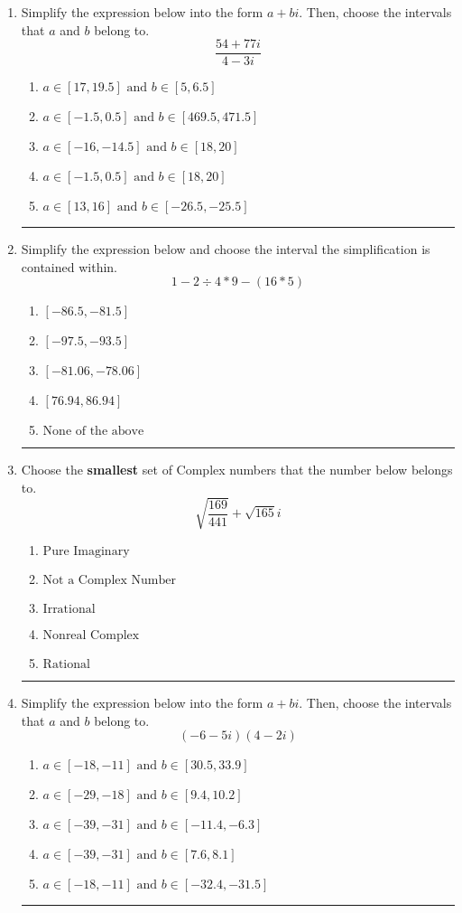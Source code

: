 \documentclass[14pt]{extbook}
\newcommand{\litem}[1]{\item#1\hspace*{-1cm}\rule{\textwidth}{0.4pt}}
\begin{document}
\begin{enumerate}
{\begin{enumerate}[label=\Alph*.]
\end{enumerate} }
\litem{
Simplify the expression below into the form $a+bi$. Then, choose the intervals that $a$ and $b$ belong to.\[ \frac{54 + 77 i}{4 - 3 i} \]\begin{enumerate}[label=\Alph*.]
\item \( a \in [17, 19.5] \text{ and } b \in [5, 6.5] \)
\item \( a \in [-1.5, 0.5] \text{ and } b \in [469.5, 471.5] \)
\item \( a \in [-16, -14.5] \text{ and } b \in [18, 20] \)
\item \( a \in [-1.5, 0.5] \text{ and } b \in [18, 20] \)
\item \( a \in [13, 16] \text{ and } b \in [-26.5, -25.5] \)

\end{enumerate} }
\litem{
Simplify the expression below and choose the interval the simplification is contained within.\[ 1 - 2 \div 4 * 9 - (16 * 5) \]\begin{enumerate}[label=\Alph*.]
\item \( [-86.5, -81.5] \)
\item \( [-97.5, -93.5] \)
\item \( [-81.06, -78.06] \)
\item \( [76.94, 86.94] \)
\item \( \text{None of the above} \)

\end{enumerate} }
\litem{
Choose the \textbf{smallest} set of Complex numbers that the number below belongs to.\[ \sqrt{\frac{169}{441}}+\sqrt{165} i \]\begin{enumerate}[label=\Alph*.]
\item \( \text{Pure Imaginary} \)
\item \( \text{Not a Complex Number} \)
\item \( \text{Irrational} \)
\item \( \text{Nonreal Complex} \)
\item \( \text{Rational} \)

\end{enumerate} }
\litem{
Simplify the expression below into the form $a+bi$. Then, choose the intervals that $a$ and $b$ belong to.\[ (-6 - 5 i)(4 - 2 i) \]\begin{enumerate}[label=\Alph*.]
\item \( a \in [-18, -11] \text{ and } b \in [30.5, 33.9] \)
\item \( a \in [-29, -18] \text{ and } b \in [9.4, 10.2] \)
\item \( a \in [-39, -31] \text{ and } b \in [-11.4, -6.3] \)
\item \( a \in [-39, -31] \text{ and } b \in [7.6, 8.1] \)
\item \( a \in [-18, -11] \text{ and } b \in [-32.4, -31.5] \)


\end{enumerate}}
\end{enumerate}
\end{document}
